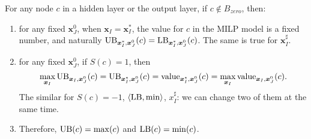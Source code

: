 		\begin{lemma} \label{lem:main}
				For any node $c$ in a hidden layer or the output layer, if $c\notin B_{zero}$, then:		\begin{enumerate}
					\item for any fixed $\boldsymbol{x}^0_J$, when  $\boldsymbol{x}_I=\boldsymbol{x}^*_I$, the value for $c$ in the MILP model is a fixed number, and naturally $\mathrm{UB}_{\boldsymbol{x}^*_I,\boldsymbol{x}^0_J}(c)=\mathrm{LB}_{\boldsymbol{x}^*_I,\boldsymbol{x}^0_J}(c)$. The same is true for $\boldsymbol{x}^\sharp_I$.
					
					\item for any fixed $\boldsymbol{x}^0_J$, if $S(c)=1$, then $$\max_{\boldsymbol{x}_I} \mathrm{UB}_{\boldsymbol{x}_I,\boldsymbol{x}^0_J}(c)=\mathrm{UB}_{\boldsymbol{x}^*_I,\boldsymbol{x}^0_J}(c)= {\textrm{value}}_{\boldsymbol{x}^*_I,\boldsymbol{x}^0_J}(c) = \max_{\boldsymbol{x}_I} {\textrm{value}}_{\boldsymbol{x}_I,\boldsymbol{x}^0_J}(c).$$ The similar for $S(c)=-1$, $\langle \mathrm{LB},\min\rangle$, $x^\sharp_I$: we can change two of them at the same time.
					
					\item Therefore, $\mathrm{UB}(c)=\max(c)$ and $\mathrm{LB}(c)=\min(c)$.
				\end{enumerate}
				
				
				
			\end{lemma}
			


